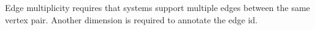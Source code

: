 
Edge multiplicity requires that systems support multiple edges between the same
vertex pair. Another dimension is required to annotate the edge id.


